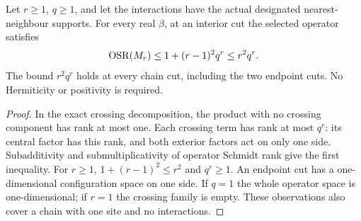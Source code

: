 \begin{lemma}
    \label{thm:physical_cluster_all_cut_rank}
    \leanok

    Let $r\geq1$, $q\geq1$, and let the interactions have the actual
    designated nearest-neighbour supports. For every real $\beta$,
    at an interior cut the selected operator satisfies
    \begin{align}
        \operatorname{OSR}(M_r)
        \leq1+(r-1)^2q^r\leq r^2q^r.\notag
    \end{align}
    The bound $r^2q^r$ holds at every chain cut, including the two
    endpoint cuts. No Hermiticity or positivity is required.
\end{lemma}
\begin{proof}\leanok
    In the exact crossing decomposition, the product with no
    crossing component has rank at most one. Each crossing term
    has rank at most $q^r$: its central factor has this rank, and
    both exterior factors act on only one side. Subadditivity and
    submultiplicativity of operator Schmidt rank give the first
    inequality. For $r\geq1$, $1+(r-1)^2\leq r^2$ and $q^r\geq1$.
    An endpoint cut has a one-dimensional configuration space on
    one side. If $q=1$ the whole operator space is one-dimensional;
    if $r=1$ the crossing family is empty. These observations also
    cover a chain with one site and no interactions.
\end{proof}

